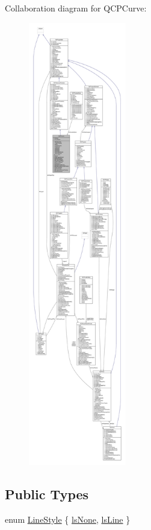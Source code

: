 Collaboration diagram for Q\+C\+P\+Curve\+:\nopagebreak
\begin{figure}[H]
\begin{center}
\leavevmode
\includegraphics[height=550pt]{class_q_c_p_curve__coll__graph}
\end{center}
\end{figure}
\subsection*{Public Types}
\begin{DoxyCompactItemize}
\item 
enum \hyperlink{class_q_c_p_curve_a2710e9f79302152cff794c6e16cc01f1}{Line\+Style} \{ \hyperlink{class_q_c_p_curve_a2710e9f79302152cff794c6e16cc01f1aec1601a191cdf0b4e761c4c66092cc48}{ls\+None}, 
\hyperlink{class_q_c_p_curve_a2710e9f79302152cff794c6e16cc01f1ade5822ce6fbf131d3df131795c2e1003}{ls\+Line}
 \}
\end{DoxyCompactItemize}
